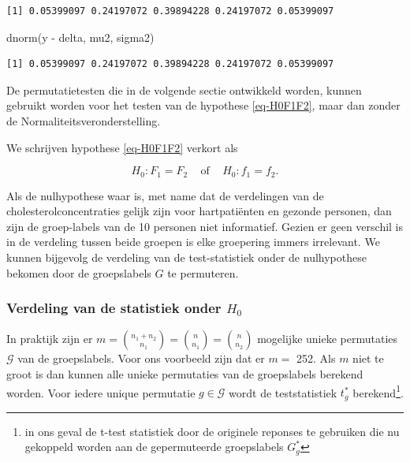 \documentclass[
  dutch,
  letterpaper,
  12pt]{book}
\newenvironment{Shaded}{\begin{snugshade}}{\end{snugshade}}
\newcommand{\FunctionTok}[1]{\textcolor[rgb]{0.28,0.35,0.67}{#1}}
\newcommand{\NormalTok}[1]{\textcolor[rgb]{0.00,0.23,0.31}{#1}}
\newcommand{\SpecialCharTok}[1]{\textcolor[rgb]{0.37,0.37,0.37}{#1}}
\theoremstyle{definition}
\theoremstyle{definition}
\theoremstyle{definition}
\theoremstyle{remark}
\begin{document}
\begin{verbatim}
[1] 0.05399097 0.24197072 0.39894228 0.24197072 0.05399097
\end{verbatim}

\begin{Shaded}
\begin{Highlighting}[]
\FunctionTok{dnorm}\NormalTok{(y }\SpecialCharTok{{-}}\NormalTok{ delta, mu2, sigma2)}
\end{Highlighting}
\end{Shaded}

\begin{verbatim}
[1] 0.05399097 0.24197072 0.39894228 0.24197072 0.05399097
\end{verbatim}

De permutatietesten die in de volgende sectie ontwikkeld worden, kunnen
gebruikt worden voor het testen van de hypothese \ref{eq-H0F1F2}, maar
dan zonder de Normaliteitsveronderstelling.

We schrijven hypothese \ref{eq-H0F1F2} verkort als

\[H_0: F_1=F_2 \;\;\;\text{ of }\;\;\; H_0:f_1=f_2.\]

Als de nulhypothese waar is, met name dat de verdelingen van de
cholesterolconcentraties gelijk zijn voor hartpatiënten en gezonde
personen, dan zijn de groep-labels van de 10 personen niet informatief.
Gezien er geen verschil is in de verdeling tussen beide groepen is elke
groepering immers irrelevant. We kunnen bijgevolg de verdeling van de
test-statistiek onder de nulhypothese bekomen door de groepslabels \(G\)
te permuteren.

\subsubsection{\texorpdfstring{Verdeling van de statistiek onder
\(H_0\)}{Verdeling van de statistiek onder H\_0}}\label{verdeling-van-de-statistiek-onder-h_0}

In praktijk zijn er
\(m=\binom{n_1+n_2}{n_1}=\binom{n}{n_1}=\binom{n}{n_2}\) mogelijke
unieke permutaties \(\mathcal{G}\) van de groepslabels. Voor ons
voorbeeld zijn dat er \(m=\) 252. Als \(m\) niet te groot is dan kunnen
alle unieke permutaties van de groepslabels berekend worden. Voor iedere
unique permutatie \(g \in \mathcal{G}\) wordt de teststatistiek
\(t^*_g\) berekend\footnote{in ons geval de t-test statistiek door de
  originele reponses te gebruiken die nu gekoppeld worden aan de
  gepermuteerde groepslabels \(G_g^*\)}.
\end{document}

